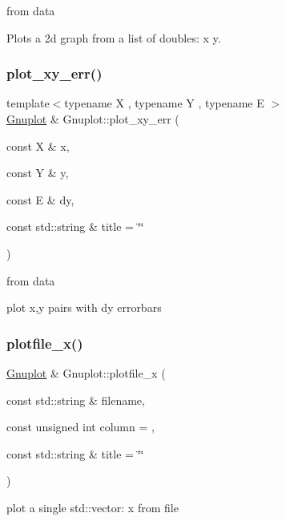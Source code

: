 from data 

Plots a 2d graph from a list of doubles\+: x y. \mbox{\label{class_gnuplot_a3c5d382eba33f92b26ba85f201bc7dea}} 
\subsubsection{\texorpdfstring{plot\+\_\+xy\+\_\+err()}{plot\_xy\_err()}}
{\footnotesize\ttfamily template$<$typename X , typename Y , typename E $>$ \\
\hyperlink{class_gnuplot}{Gnuplot} \& Gnuplot\+::plot\+\_\+xy\+\_\+err (\begin{DoxyParamCaption}\item[{const X \&}]{x,  }\item[{const Y \&}]{y,  }\item[{const E \&}]{dy,  }\item[{const std\+::string \&}]{title = {\ttfamily \char`\"{}\char`\"{}} }\end{DoxyParamCaption})}



from data 





plot x,y pairs with dy errorbars \mbox{\label{class_gnuplot_a4fc34218cdfdd27a65b92eea1f1f9e84}} 
\subsubsection{\texorpdfstring{plotfile\+\_\+x()}{plotfile\_x()}}
{\footnotesize\ttfamily \hyperlink{class_gnuplot}{Gnuplot} \& Gnuplot\+::plotfile\+\_\+x (\begin{DoxyParamCaption}\item[{const std\+::string \&}]{filename,  }\item[{const unsigned int}]{column = {},  }\item[{const std\+::string \&}]{title = {\ttfamily \char`\"{}\char`\"{}} }\end{DoxyParamCaption})}

plot a single std\+::vector\+: x from file \mbox{\label{class_gnuplot_a10e1fc7344bd726faa2d70cd5ced5e5e}} 
